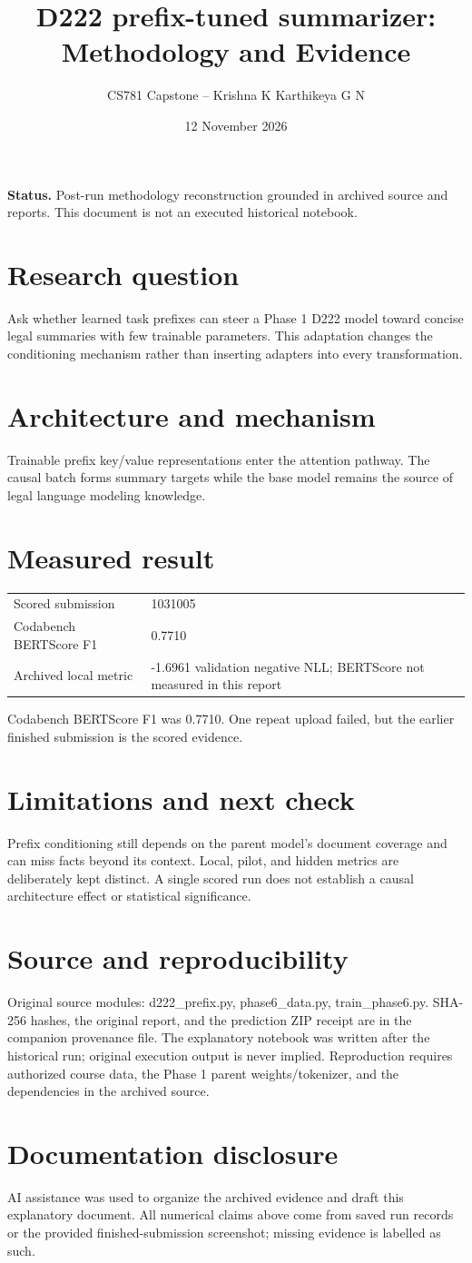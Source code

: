 \documentclass[11pt,a4paper]{article}
\title{D222 prefix-tuned summarizer: Methodology and Evidence}
\author{CS781 Capstone -- Krishna K Karthikeya G N}
\date{12 November 2026}
\begin{document}
\maketitle
\noindent\textbf{Status.} Post-run methodology reconstruction grounded in archived source and reports. This document is not an executed historical notebook.\par
\section*{Research question}
Ask whether learned task prefixes can steer a Phase 1 D222 model toward concise legal summaries with few trainable parameters. This adaptation changes the conditioning mechanism rather than inserting adapters into every transformation.
\section*{Architecture and mechanism}
Trainable prefix key/value representations enter the attention pathway. The causal batch forms summary targets while the base model remains the source of legal language modeling knowledge.
\section*{Measured result}
\begin{center}\begin{tabular}{ll}Scored submission & 1031005\\
Codabench BERTScore F1 & 0.7710\\
Archived local metric & -1.6961 validation negative NLL; BERTScore not measured in this report\end{tabular}\end{center}
Codabench BERTScore F1 was 0.7710. One repeat upload failed, but the earlier finished submission is the scored evidence.
\section*{Limitations and next check}
Prefix conditioning still depends on the parent model's document coverage and can miss facts beyond its context. Local, pilot, and hidden metrics are deliberately kept distinct. A single scored run does not establish a causal architecture effect or statistical significance.
\section*{Source and reproducibility}
Original source modules: d222\_prefix.py, phase6\_data.py, train\_phase6.py. SHA-256 hashes, the original report, and the prediction ZIP receipt are in the companion provenance file. The explanatory notebook was written after the historical run; original execution output is never implied. Reproduction requires authorized course data, the Phase 1 parent weights/tokenizer, and the dependencies in the archived source.
\section*{Documentation disclosure}
AI assistance was used to organize the archived evidence and draft this explanatory document. All numerical claims above come from saved run records or the provided finished-submission screenshot; missing evidence is labelled as such.
\end{document}
